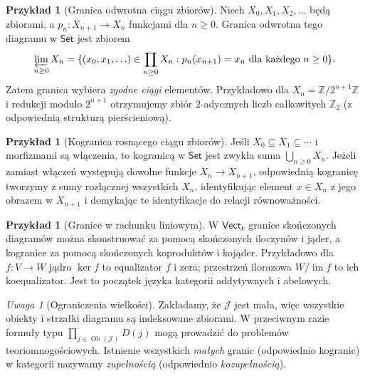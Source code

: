\documentclass[11pt,a4paper]{article}
\numberwithin{equation}{section}
\theoremstyle{plain}
\theoremstyle{definition}
\newtheorem{przyklad}[twierdzenie]{Przykład}
\theoremstyle{remark}
\newtheorem{uwaga}[twierdzenie]{Uwaga}
\newcommand{\cat}[1]{\mathsf{#1}}
\newcommand{\Set}{\cat{Set}}
\newcommand{\Vect}{\cat{Vect}}
\newcommand{\Ob}{\operatorname{Ob}}
\newcommand{\im}{\operatorname{im}}
\newcommand{\Ker}{\operatorname{ker}}
\begin{document}
\begin{przyklad}[Granica odwrotna ciągu zbiorów]\label{przyklad:inverse-limit}
Niech $X_0,X_1,X_2,\ldots$ będą zbiorami, a $p_n:X_{n+1}\to X_n$ funkcjami dla $n\geq0$. Granica odwrotna tego diagramu w $\Set$ jest zbiorem
\[
\varprojlim_{n\geq0}X_n=\{(x_0,x_1,\ldots)\in\prod_{n\geq0}X_n:p_n(x_{n+1})=x_n\text{ dla każdego }n\geq0\}.
\]
Zatem granica wybiera \emph{zgodne ciągi} elementów. Przykładowo dla $X_n=\mathbb Z/2^{n+1}\mathbb Z$ i redukcji modulo $2^{n+1}$ otrzymujemy zbiór $2$-adycznych liczb całkowitych $\mathbb Z_2$ (z odpowiednią strukturą pierścieniową).
\end{przyklad}

\begin{przyklad}[Kogranica rosnącego ciągu zbiorów]
Jeśli $X_0\subseteq X_1\subseteq\cdots$ i morfizmami są włączenia, to kogranicą w $\Set$ jest zwykła suma $\bigcup_{n\geq0}X_n$. Jeżeli zamiast włączeń występują dowolne funkcje $X_n\to X_{n+1}$, odpowiednią kogranicę tworzymy z sumy rozłącznej wszystkich $X_n$, identyfikując element $x\in X_n$ z jego obrazem w $X_{n+1}$ i domykając te identyfikacje do relacji równoważności.
\end{przyklad}

\begin{przyklad}[Granice w rachunku liniowym]
W $\Vect_k$ granice skończonych diagramów można skonstruować za pomocą skończonych iloczynów i jąder, a kogranice za pomocą skończonych koproduktów i kojąder. Przykładowo dla $f:V\to W$ jądro $\Ker f$ to equalizator $f$ i zera; przestrzeń ilorazowa $W/\im f$ to ich koequalizator. Jest to początek języka kategorii addytywnych i abelowych.
\end{przyklad}

\begin{uwaga}[Ograniczenia wielkości]
Zakładamy, że $\mathcal J$ jest mała, więc wszystkie obiekty i strzałki diagramu są indeksowane zbiorami. W przeciwnym razie formuły typu $\prod_{j\in\Ob(\mathcal J)}D(j)$ mogą prowadzić do problemów teoriomnogościowych. Istnienie wszystkich \emph{małych} granic (odpowiednio kogranic) w kategorii nazywamy \emph{zupełnością} (odpowiednio \emph{kozupełnością}).
\end{uwaga}
\end{document}

